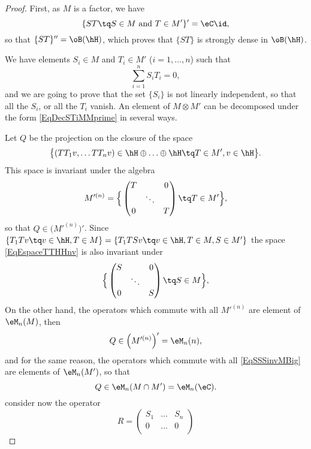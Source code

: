 \begin{proof}
	First, as $M$ is a factor, we have
	\[
		\{ ST\tq S\in M\text{ and }T\in M' \}'=\eC\id,
	\]
	so that $\{ ST \}''=\oB(\hH)$, which proves that $\{ ST \}$ is strongly dense in $\oB(\hH)$.

	We have elements $S_i\in M$ and $T_i\in M'$ ($i=1,\ldots,n$) such that
	\begin{equation}		\label{EqDecSTiMMprime}
		\sum_{i=1}^nS_iT_i=0,
	\end{equation}
	and we are going to prove that the set $\{ S_i \}$ is not linearly independent, so that all the $S_i$, or all the $T_i$ vanish. An element of $M\otimes M'$ can be decomposed under the form \eqref{EqDecSTiMMprime} in several ways.

	Let $Q$ be the projection on the closure of the space
	\begin{equation}	\label{EqEspaceTTHHnv}
		\big\{
		(TT_1v,\ldots TT_nv)\in\hH\oplus\ldots\oplus\hH\tq T\in M', v\in\hH
		\big\}.
	\end{equation}
	This space is invariant under the algebra
	\begin{equation}
		M'^{(n)}=\Big\{
		\begin{pmatrix}
			T &        & 0 \\
			  & \ddots     \\
			0 &        & T
		\end{pmatrix}
		\tq T\in M' \Big\},
	\end{equation}
	so that $Q\in\Big( M'^{(n)} \Big)'$. Since $\{ T_1Tv\tq v\in\hH, T\in M \}=\{ T_1TSv\tq v\in \hH,T\in M,S\in M' \}$ the space \eqref{EqEspaceTTHHnv} is also invariant under
	\begin{equation}		\label{EqSSSinvMBig}
		\Big\{
		\begin{pmatrix}
			S &        & 0 \\
			  & \ddots     \\
			0 &        & S
		\end{pmatrix}
		\tq S\in M \Big\},
	\end{equation}
	On the other hand, the operators which commute with all $M'^{(n)}$ are element of $\eM_n(M)$, then
	\[
		Q\in\Big( M'^{(n)} \Big)'=\eM_n(n),
	\]
	and for the same reason, the operators which commute with all \eqref{EqSSSinvMBig} are elements of $\eM_n(M')$, so that
	\[
		Q\in\eM_n(M\cap M')=\eM_n(\eC).
	\]
	consider now the operator
	\[
		R=
		\begin{pmatrix}
			S_1    & \ldots & S_n    \\
			0      & \ldots & 0      \\

\end{pmatrix}\]
\end{proof}
